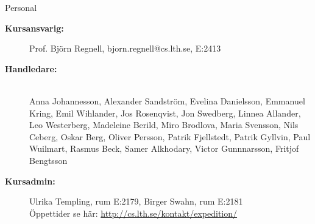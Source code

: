 \ifkompendium\else
\begin{SlideExtra}{Personal \CurrentYear}\SlideFontSmall
\begin{description}
\item [\bfseries Kursansvarig:] Prof. Björn Regnell, bjorn.regnell@cs.lth.se, E:2413
\item [\bfseries Handledare:]\\
\TODO
Anna	Johannesson,
Alexander	Sandström,
Evelina	Danielsson,
Emmanuel	Kring,
Emil	Wihlander,
Jos	Rosenqvist,
Jon	Swedberg,
Linnea	Allander,
Leo	Westerberg,
Madeleine	Berild,
Miro	Brodlova,
Maria	Svensson,
Nils	Ceberg,
Oskar	Berg,
Oliver	Persson,
Patrik	Fjellstedt,
Patrik	Gyllvin,
Paul	Wuilmart,
Rasmus	Beck,
Samer	Alkhodary,
Victor	Gunnnarsson,
Fritjof	Bengtsson
\item [\bfseries Kursadmin:]
Ulrika Templing, rum E:2179, Birger Swahn, rum E:2181 \\
Öppettider se här: 
\url{http://cs.lth.se/kontakt/expedition/} \\
\end{description}
\end{SlideExtra}
\fi


